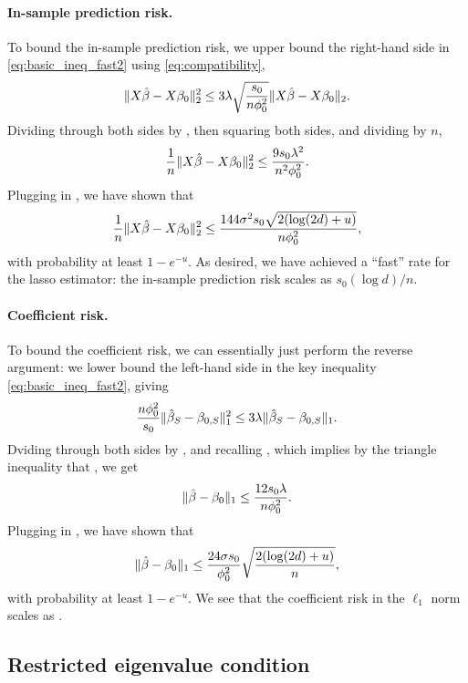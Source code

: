 \documentclass{article}
\begin{document}
\paragraph{In-sample prediction risk.}

To bound the in-sample prediction risk, we upper bound the right-hand side in
\eqref{eq:basic_ineq_fast2} using \eqref{eq:compatibility},  
\[
\|X\hat{\beta} - X\beta_0\|_2^2 \leq 3 \lambda \sqrt{\frac{s_0}{n\phi_0^2}} 
\|X\hat{\beta} - X\beta_0\|_2.  
\]
Dividing through both sides by , then squaring
both sides, and dividing by $n$, 
\[
\frac{1}{n} \|X\hat{\beta} - X\beta_0\|_2^2 \leq \frac{9 s_0 \lambda^2}
  {n^2 \phi_0^2}.
\]
Plugging in , we have 
shown that 
\begin{equation}
\label{eq:risk_lasso_fast1}
\frac{1}{n} \|X\hat{\beta}-X\beta_0\|_2^2 \leq \frac{144 \sigma^2 s_0 \sqrt{2
    (\log(2d) + u)}}{n \phi_0^2},   
\end{equation}
with probability at least $1-e^{-u}$. As desired, we have achieved a ``fast''
rate for the lasso estimator: the in-sample prediction risk scales as $s_0(\log
d)/n$.  

\paragraph{Coefficient risk.}

To bound the coefficient risk, we can essentially just perform the reverse
argument: we lower bound the left-hand side in the key inequality
\eqref{eq:basic_ineq_fast2}, giving  
\[
\frac{n \phi_0^2}{s_0} \|\hat{\beta}_S - \beta_{0,S} \|_1^2 \leq 3 \lambda 
 \|\hat{\beta}_S - \beta_{0,S}\|_1.
\]
Dviding through both sides by , and
recalling , which
implies by the triangle inequality that , we get
\[
\|\hat{\beta}-\beta_0\|_1 \leq \frac{12 s_0 \lambda}{n \phi_0^2}.
\]
Plugging in , we have 
shown that 
\begin{equation}
\label{eq:risk_lasso_fast2}
\|\hat{\beta} - \beta_0\|_1 \leq \frac{24 \sigma s_0}{\phi_0^2}
\sqrt{\frac{2 (\log(2d) + u)}{n}},
\end{equation}
with probability at least $1-e^{-u}$. We see that the coefficient risk in the
$\ell_1$ norm scales as . 

\subsection{Restricted eigenvalue condition}
\end{document}
